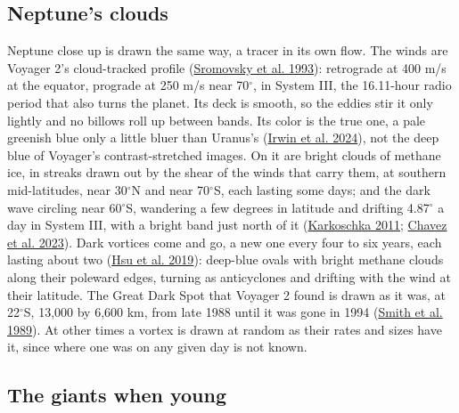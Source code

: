 \documentclass[9pt,twocolumn]{extarticle}
\begin{document}
\subsection{Neptune's clouds}\label{neptune-s-clouds}

Neptune close up is drawn the same way, a tracer in its own flow. The winds are Voyager 2's cloud-tracked profile (\protect\hyperlink{cite.sromovsky1993}{Sromovsky et al. 1993}): retrograde at 400 m/s at the equator, prograde at 250 m/s near 70$^\circ$, in System III, the 16.11-hour radio period that also turns the planet. Its deck is smooth, so the eddies stir it only lightly and no billows roll up between bands. Its color is the true one, a pale greenish blue only a little bluer than Uranus's (\protect\hyperlink{cite.irwin2024}{Irwin et al. 2024}), not the deep blue of Voyager's contrast-stretched images. On it are bright clouds of methane ice, in streaks drawn out by the shear of the winds that carry them, at southern mid-latitudes, near 30$^\circ$N and near 70$^\circ$S, each lasting some days; and the dark wave circling near 60$^\circ$S, wandering a few degrees in latitude and drifting 4.87$^\circ$ a day in System III, with a bright band just north of it (\protect\hyperlink{cite.karkoschka2011}{Karkoschka 2011}; \protect\hyperlink{cite.chavez2023}{Chavez et al. 2023}). Dark vortices come and go, a new one every four to six years, each lasting about two (\protect\hyperlink{cite.hsu2019}{Hsu et al. 2019}): deep-blue ovals with bright methane clouds along their poleward edges, turning as anticyclones and drifting with the wind at their latitude. The Great Dark Spot that Voyager 2 found is drawn as it was, at 22$^\circ$S, 13,000 by 6,600 km, from late 1988 until it was gone in 1994 (\protect\hyperlink{cite.smith1989}{Smith et al. 1989}). At other times a vortex is drawn at random as their rates and sizes have it, since where one was on any given day is not known.


\subsection{The giants when young}\label{the-giants-when-young}
\end{document}
